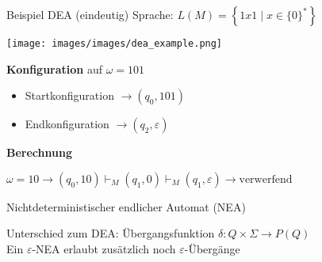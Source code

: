\begin{example2}{Beispiel DEA (eindeutig)} Sprache: $L(M)=\left\{1 x 1 \mid x \in\{0\}^{*}\right\}$
    
    \begin{minipage}{0.45\linewidth}
        \texttt{[image: images/images/dea\_example.png]}
    \end{minipage}
    \hspace{1mm}
    \begin{minipage}{0.5\linewidth}
        \textbf{Konfiguration} auf $\omega=101$
        \begin{itemize}
        \item Startkonfiguration $\rightarrow\left(q_{0}, 101\right)$
        \item Endkonfiguration $\rightarrow\left(q_{2}, \varepsilon\right)$
        \end{itemize}
    \end{minipage}

    \textbf{Berechnung}


    
    $\omega=10 \rightarrow\left(q_{0}, 10\right) \vdash_{M}\left(q_{1}, 0\right) \vdash_{M}\left(q_{1}, \varepsilon\right) \rightarrow \text{verwerfend}$
    
\end{example2}


\begin{definition}{Nichtdeterministischer endlicher Automat (NEA)}
    
        Unterschied zum DEA: Übergangsfunktion $\delta: Q \times \Sigma \rightarrow P(Q)$\\
        Ein $\varepsilon$-NEA erlaubt zusätzlich noch $\varepsilon$-Übergänge
\end{definition}




